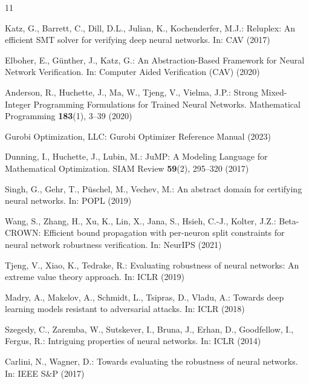 \documentclass[runningheads]{llncs}
\begin{document}
\begin{thebibliography}{11}

  Katz, G., Barrett, C., Dill, D.L., Julian, K., Kochenderfer, M.J.:
  Reluplex: An efficient SMT solver for verifying deep neural networks.
  In: CAV (2017)

  Elboher, E., G\"unther, J., Katz, G.:
  An Abstraction-Based Framework for Neural Network Verification.
  In: Computer Aided Verification (CAV) (2020)

  Anderson, R., Huchette, J., Ma, W., Tjeng, V., Vielma, J.P.:
  Strong Mixed-Integer Programming Formulations for Trained Neural Networks.
  Mathematical Programming \textbf{183}(1), 3--39 (2020)

  Gurobi Optimization, LLC:
  Gurobi Optimizer Reference Manual (2023)

  Dunning, I., Huchette, J., Lubin, M.:
  JuMP: A Modeling Language for Mathematical Optimization.
  SIAM Review \textbf{59}(2), 295--320 (2017)

  Singh, G., Gehr, T., P\"uschel, M., Vechev, M.:
  An abstract domain for certifying neural networks.
  In: POPL (2019)

  Wang, S., Zhang, H., Xu, K., Lin, X., Jana, S., Hsieh, C.-J., Kolter, J.Z.:
  Beta-CROWN: Efficient bound propagation with per-neuron split constraints for neural network robustness verification.
  In: NeurIPS (2021)

  Tjeng, V., Xiao, K., Tedrake, R.:
  Evaluating robustness of neural networks: An extreme value theory approach.
  In: ICLR (2019)

  Madry, A., Makelov, A., Schmidt, L., Tsipras, D., Vladu, A.:
  Towards deep learning models resistant to adversarial attacks.
  In: ICLR (2018)

  Szegedy, C., Zaremba, W., Sutskever, I., Bruna, J., Erhan, D., Goodfellow, I., Fergus, R.:
  Intriguing properties of neural networks.
  In: ICLR (2014)

  Carlini, N., Wagner, D.:
  Towards evaluating the robustness of neural networks.
  In: IEEE S\&P (2017)

\end{thebibliography}
\end{document}
